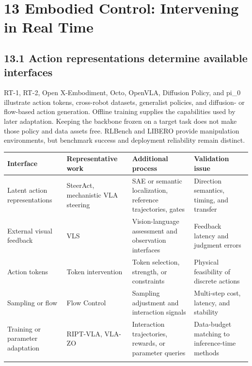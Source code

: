 \section*{13 Embodied Control: Intervening in Real Time}

\subsection*{13.1 Action representations determine available interfaces}

RT-1, RT-2, Open X-Embodiment, Octo, OpenVLA, Diffusion Policy, and pi\_0 illustrate action tokens, cross-robot datasets, generalist policies, and diffusion- or flow-based action generation.\cite{r178,r179,r181,r182,r183,r184,r185} Offline training supplies the capabilities used by later adaptation. Keeping the backbone frozen on a target task does not make those policy and data assets free. RLBench and LIBERO provide manipulation environments, but benchmark success and deployment reliability remain distinct.\cite{r177,r180}


\begingroup\small\setlength{\tabcolsep}{5pt}\renewcommand{\arraystretch}{1.18}

\begin{longtable}{>{\raggedright\arraybackslash}p{3.53cm}>{\raggedright\arraybackslash}p{3.53cm}>{\raggedright\arraybackslash}p{3.53cm}>{\raggedright\arraybackslash}p{3.53cm}}

\toprule

\textbf{Interface} & \textbf{Representative work} & \textbf{Additional process} & \textbf{Validation issue}\\\midrule\endhead

Latent action representations & SteerAct, mechanistic VLA steering \cite{r176,r189} & SAE or semantic localization, reference trajectories, gates & Direction semantics, timing, and transfer\\\addlinespace[3pt]

External visual feedback & VLS \cite{r192} & Vision-language assessment and observation interfaces & Feedback latency and judgment errors\\\addlinespace[3pt]

Action tokens & Token intervention \cite{r196} & Token selection, strength, or constraints & Physical feasibility of discrete actions\\\addlinespace[3pt]

Sampling or flow & Flow Control \cite{r195} & Sampling adjustment and interaction signals & Multi-step cost, latency, and stability\\\addlinespace[3pt]

Training or parameter adaptation & RIPT-VLA, VLA-ZO \cite{r187,r83} & Interaction trajectories, rewards, or parameter queries & Data-budget matching to inference-time methods\\\addlinespace[3pt]

\bottomrule\end{longtable}\endgroup

